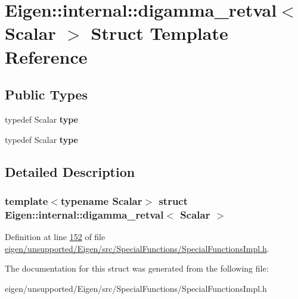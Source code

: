 \hypertarget{struct_eigen_1_1internal_1_1digamma__retval}{}\section{Eigen\+:\+:internal\+:\+:digamma\+\_\+retval$<$ Scalar $>$ Struct Template Reference}
\label{struct_eigen_1_1internal_1_1digamma__retval}
\subsection*{Public Types}
\begin{DoxyCompactItemize}
\item 
\mbox{\label{struct_eigen_1_1internal_1_1digamma__retval_a94de9797653b2b3b054386160c83309f}} 
typedef Scalar {\bfseries type}
\item 
\mbox{\label{struct_eigen_1_1internal_1_1digamma__retval_a94de9797653b2b3b054386160c83309f}} 
typedef Scalar {\bfseries type}
\end{DoxyCompactItemize}


\subsection{Detailed Description}
\subsubsection*{template$<$typename Scalar$>$\newline
struct Eigen\+::internal\+::digamma\+\_\+retval$<$ Scalar $>$}



Definition at line \hyperlink{eigen_2unsupported_2_eigen_2src_2_special_functions_2_special_functions_impl_8h_source_l00152}{152} of file \hyperlink{eigen_2unsupported_2_eigen_2src_2_special_functions_2_special_functions_impl_8h_source}{eigen/unsupported/\+Eigen/src/\+Special\+Functions/\+Special\+Functions\+Impl.\+h}.



The documentation for this struct was generated from the following file\+:\begin{DoxyCompactItemize}
\item 
eigen/unsupported/\+Eigen/src/\+Special\+Functions/\+Special\+Functions\+Impl.\+h\end{DoxyCompactItemize}
